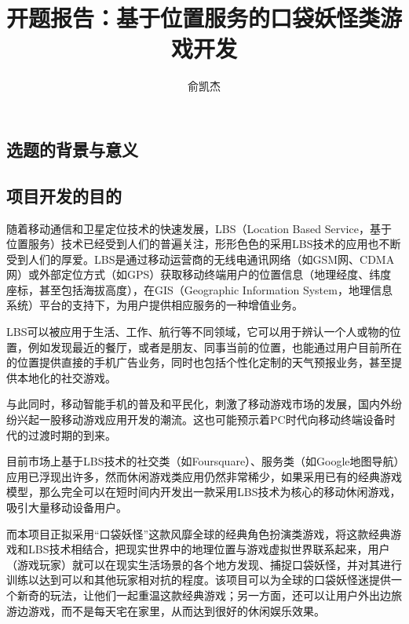 \documentclass{article}
\title{开题报告：基于位置服务的口袋妖怪类游戏开发}
\author{俞凯杰}
\begin{document}
\begin{CJK}{UTF8}{gbsn}
  \maketitle

  \renewcommand{\abstractname}{摘要}
	\renewcommand{\figurename}{图}
	\renewcommand{\refname}{参考文献}

	

  \section{选题的背景与意义}
  \subsection{项目开发的目的}

  随着移动通信和卫星定位技术的快速发展，LBS（Location Based Service，基于位置服务）技术已经受到人们的普遍关注，形形色色的采用LBS技术的应用也不断受到人们的厚爱。LBS是通过移动运营商的无线电通讯网络（如GSM网、CDMA网）或外部定位方式（如GPS）获取移动终端用户的位置信息（地理经度、纬度座标，甚至包括海拔高度），在GIS（Geographic Information System，地理信息系统）平台的支持下，为用户提供相应服务的一种增值业务。

  LBS可以被应用于生活、工作、航行等不同领域，它可以用于辨认一个人或物的位置，例如发现最近的餐厅，或者是朋友、同事当前的位置，也能通过用户目前所在的位置提供直接的手机广告业务，同时也包括个性化定制的天气预报业务，甚至提供本地化的社交游戏。

  与此同时，移动智能手机的普及和平民化，刺激了移动游戏市场的发展，国内外纷纷兴起一股移动游戏应用开发的潮流。这也可能预示着PC时代向移动终端设备时代的过渡时期的到来。

  目前市场上基于LBS技术的社交类（如Foursquare）、服务类（如Google地图导航）应用已浮现出许多，然而休闲游戏类应用仍然非常稀少，如果采用已有的经典游戏模型，那么完全可以在短时间内开发出一款采用LBS技术为核心的移动休闲游戏，吸引大量移动设备用户。
  
  而本项目正拟采用“口袋妖怪”这款风靡全球的经典角色扮演类游戏，将这款经典游戏和LBS技术相结合，把现实世界中的地理位置与游戏虚拟世界联系起来，用户（游戏玩家）就可以在现实生活场景的各个地方发现、捕捉口袋妖怪，并对其进行训练以达到可以和其他玩家相对抗的程度。该项目可以为全球的口袋妖怪迷提供一个新奇的玩法，让他们一起重温这款经典游戏；另一方面，还可以让用户外出边旅游边游戏，而不是每天宅在家里，从而达到很好的休闲娱乐效果。
  


\end{CJK}
\end{document}
